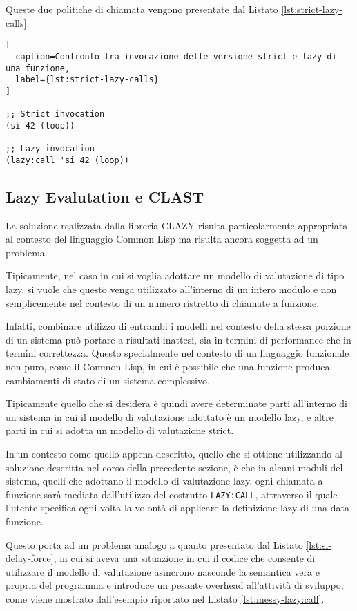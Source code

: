 Queste due politiche di chiamata vengono presentate dal Listato \ref{lst:strict-lazy-calls}.

\begin{lstlisting}[
  caption=Confronto tra invocazione delle versione strict e lazy di una funzione,
  label={lst:strict-lazy-calls}
]

;; Strict invocation
(si 42 (loop))

;; Lazy invocation
(lazy:call 'si 42 (loop))

\end{lstlisting}

\subsection{Lazy Evalutation e CLAST}

La soluzione realizzata dalla libreria CLAZY risulta particolarmente appropriata al contesto del linguaggio Common Lisp ma risulta ancora soggetta ad un problema.

Tipicamente, nel caso in cui si voglia adottare un modello di valutazione di tipo lazy, si vuole che questo venga utilizzato all'interno di un intero modulo e non semplicemente nel contesto di un numero ristretto di chiamate a funzione.

Infatti, combinare utilizzo di entrambi i modelli nel contesto della stessa porzione di un sistema può portare a risultati inattesi, sia in termini di performance che in termini correttezza. Questo specialmente nel contesto di un linguaggio funzionale non puro, come il Common Lisp, in cui è possibile che una funzione produca cambiamenti di stato di un sistema complessivo.

Tipicamente quello che si desidera è quindi avere determinate parti all'interno di un sistema in cui il modello di valutazione adottato è un modello lazy, e altre parti in cui si adotta un modello di valutazione strict.

In un contesto come quello appena descritto, quello che si ottiene utilizzando al soluzione descritta nel corso della precedente sezione, è che in alcuni moduli del sistema, quelli che adottano il modello di valutazione lazy, ogni chiamata a funzione sarà mediata dall'utilizzo del costrutto \texttt{LAZY:CALL}, attraverso il quale l'utente specifica ogni volta la volontà di applicare la definizione lazy di una data funzione.

Questo porta ad un problema analogo a quanto presentato dal Listato \ref{lst:si-delay-force}, in cui si aveva una situazione in cui il codice che consente di utilizzare il modello di valutazione asincrono nasconde la semantica vera e propria del programma e introduce un pesante overhead all'attività di sviluppo, come viene mostrato dall'esempio riportato nel Listato \ref{lst:messy-lazy:call}.

